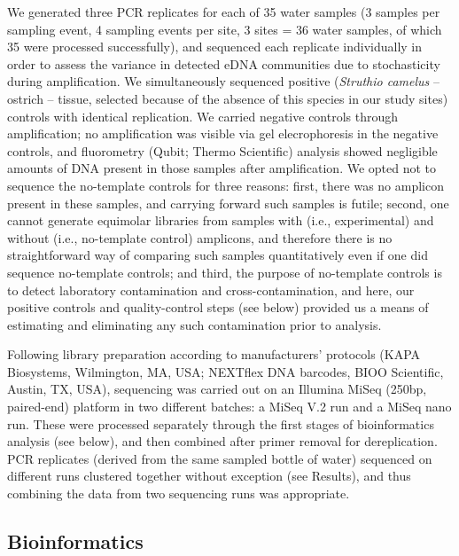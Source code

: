 \documentclass[fleqn,10pt,lineno]{wlpeerj} %
\begin{document}
We generated three PCR replicates for each of 35 water samples (3
samples per sampling event, 4 sampling events per site, 3 sites = 36
water samples, of which 35 were processed successfully), and sequenced
each replicate individually in order to assess the variance in detected
eDNA communities due to stochasticity during amplification. We
simultaneously sequenced positive (\emph{Struthio camelus} -- ostrich --
tissue, selected because of the absence of this species in our study
sites) controls with identical replication. We carried negative controls
through amplification; no amplification was visible via gel
elecrophoresis in the negative controls, and fluorometry (Qubit; Thermo
Scientific) analysis showed negligible amounts of DNA present in those
samples after amplification. We opted not to sequence the no-template
controls for three reasons: first, there was no amplicon present in
these samples, and carrying forward such samples is futile; second, one
cannot generate equimolar libraries from samples with (i.e.,
experimental) and without (i.e., no-template control) amplicons, and
therefore there is no straightforward way of comparing such samples
quantitatively even if one did sequence no-template controls; and third,
the purpose of no-template controls is to detect laboratory
contamination and cross-contamination, and here, our positive controls
and quality-control steps (see below) provided us a means of estimating
and eliminating any such contamination prior to analysis.

Following library preparation according to manufacturers' protocols
(KAPA Biosystems, Wilmington, MA, USA; NEXTflex DNA barcodes, BIOO
Scientific, Austin, TX, USA), sequencing was carried out on an Illumina
MiSeq (250bp, paired-end) platform in two different batches: a MiSeq V.2
run and a MiSeq nano run. These were processed separately through the
first stages of bioinformatics analysis (see below), and then combined
after primer removal for dereplication. PCR replicates (derived from the
same sampled bottle of water) sequenced on different runs clustered
together without exception (see Results), and thus combining the data
from two sequencing runs was appropriate.

\subsection{Bioinformatics}\label{bioinformatics}
\end{document}
